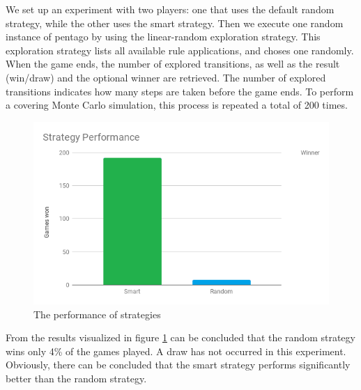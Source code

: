 \vspace{6pt}

We set up an experiment with two players: one that uses the default random strategy, while the other uses the smart strategy. 
Then we execute one random instance of pentago by using the linear-random exploration strategy. This exploration strategy lists all available rule applications, and choses one randomly.
When the game ends, the number of explored transitions, as well as the result (win/draw) and the optional winner are retrieved.
The number of explored transitions indicates how many steps are taken before the game ends.
To perform a covering Monte Carlo simulation, this process is repeated a total of 200 times.

\vspace{6pt}

\begin{figure}[h]
  \centering
  \includegraphics[scale=0.5,clip]{Images/strategywinner}
  \caption{The performance of strategies}
  \label{fig:strategywinner}
\end{figure}

From the results visualized in figure \ref{fig:strategywinner} can be concluded that the random strategy wins only 4\% of the games played. A draw has not occurred in this experiment.
Obviously, there can be concluded that the smart strategy performs significantly better than the random strategy.

\vspace{6pt}

